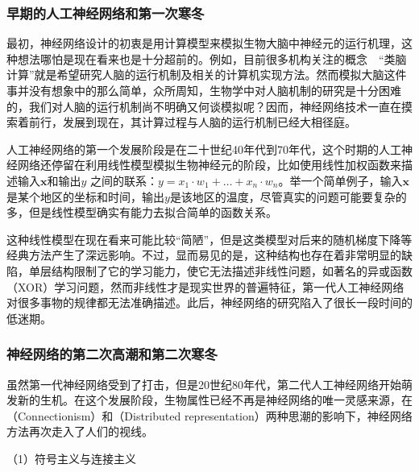 \subsubsection{早期的人工神经网络和第一次寒冬}

\parinterval 最初，神经网络设计的初衷是用计算模型来模拟生物大脑中神经元的运行机理，这种想法哪怕是现在看来也是十分超前的。例如，目前很多机构关注的概念\ \dash \ ``类脑计算''就是希望研究人脑的运行机制及相关的计算机实现方法。然而模拟大脑这件事并没有想象中的那么简单，众所周知，生物学中对人脑机制的研究是十分困难的，我们对人脑的运行机制尚不明确又何谈模拟呢？因而，神经网络技术一直在摸索着前行，发展到现在，其计算过程与人脑的运行机制已经大相径庭。

\parinterval 人工神经网络的第一个发展阶段是在二十世纪40年代到70年代，这个时期的人工神经网络还停留在利用线性模型模拟生物神经元的阶段，比如使用线性加权函数来描述输入$ \mathbf x $和输出$ y $ 之间的联系：$y=x_1 \cdot w_1 + \dots + x_n \cdot w_n $。举一个简单例子，输入$ \mathbf x $是某个地区的坐标和时间，输出$ y $是该地区的温度，尽管真实的问题可能要复杂的多，但是线性模型确实有能力去拟合简单的函数关系。

\parinterval 这种线性模型在现在看来可能比较``简陋''，但是这类模型对后来的随机梯度下降等经典方法产生了深远影响。不过，显而易见的是，这种结构也存在着非常明显的缺陷，单层结构限制了它的学习能力，使它无法描述非线性问题，如著名的异或函数（XOR）学习问题，然而非线性才是现实世界的普遍特征，第一代人工神经网络对很多事物的规律都无法准确描述。此后，神经网络的研究陷入了很长一段时间的低迷期。


\subsubsection{神经网络的第二次高潮和第二次寒冬}

\parinterval 虽然第一代神经网络受到了打击，但是20世纪80年代，第二代人工神经网络开始萌发新的生机。在这个发展阶段，生物属性已经不再是神经网络的唯一灵感来源，在{\small{}}（Connectionism）和{\small{}}（Distributed representation）两种思潮的影响下，神经网络方法再次走入了人们的视线。

\vspace{0.3em}
\parinterval （1）符号主义与连接主义
\vspace{0.3em}

